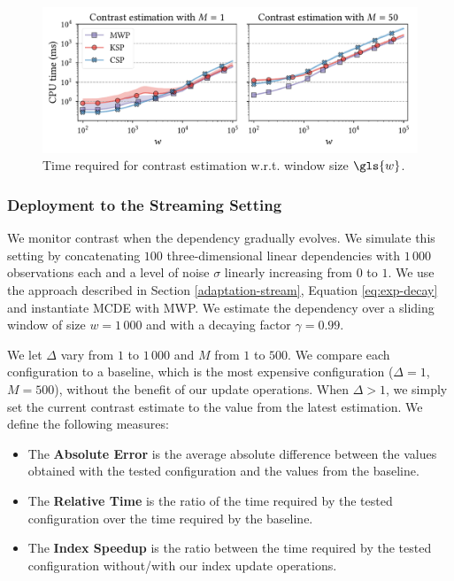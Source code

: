 \begin{figure}
    \includegraphics[width=\linewidth]{part2-figures/contrastperformance_thesis-compressed.pdf}
    \caption{Time required for contrast estimation w.r.t. window size $\gls{w}$.}
    \label{fig:scalability-contrast}
\end{figure} 

\subsubsection{Deployment to the Streaming Setting}

We monitor contrast when the dependency gradually evolves. 
We simulate this setting by concatenating $100$ three-dimensional linear dependencies with $1\,000$ observations each and a level of noise $\sigma$ 
linearly increasing from $0$ to $1$. 
We use the approach described in Section \ref{adaptation-stream}, Equation \ref{eq:exp-decay} and instantiate \gls{MCDE} with \gls{MWP}. We estimate the dependency over a sliding window of size  $w=1\,000$ and with a decaying factor $\gamma = 0.99$. 

We let $\Delta$ vary from $1$ to $1\,000$ and $M$ from $1$ to $500$. 
We compare each configuration to a baseline, which is the most expensive configuration ($\Delta=1$, $M=500$), without the benefit of our update operations. 
When $\Delta > 1$, we simply set the current contrast estimate to the value from the latest estimation. We define the following measures: 
\begin{itemize}[noitemsep]
    \item The \textbf{Absolute Error} is the average absolute difference between the values obtained with the tested configuration and the values from the baseline. 
    \item The \textbf{Relative Time} is the ratio of the time required by the tested con\-fi\-gu\-ra\-tion over the time required by the baseline.
    \item The \textbf{Index Speedup} is the ratio between the time required by the tested configuration without/with our index update operations.  
\end{itemize}

